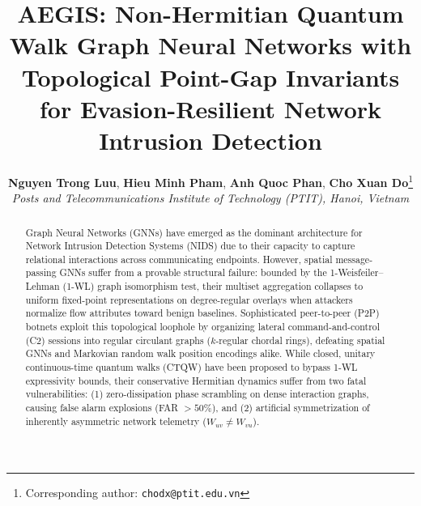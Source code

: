 \documentclass[10pt,twocolumn,letterpaper]{article}
\title{\textbf{AEGIS: Non-Hermitian Quantum Walk Graph Neural Networks with Topological Point-Gap Invariants for Evasion-Resilient Network Intrusion Detection}}
\author{
    \textbf{Nguyen Trong Luu}, \textbf{Hieu Minh Pham}, \textbf{Anh Quoc Phan}, \textbf{Cho Xuan Do}\thanks{Corresponding author: \texttt{chodx@ptit.edu.vn}} \\
    \textit{Posts and Telecommunications Institute of Technology (PTIT), Hanoi, Vietnam}
}
\date{}
\begin{document}
\maketitle

\begin{abstract}
Graph Neural Networks (GNNs) have emerged as the dominant architecture for Network Intrusion Detection Systems (NIDS) due to their capacity to capture relational interactions across communicating endpoints. However, spatial message-passing GNNs suffer from a provable structural failure: bounded by the 1-Weisfeiler--Lehman (1-WL) graph isomorphism test, their multiset aggregation collapses to uniform fixed-point representations on degree-regular overlays when attackers normalize flow attributes toward benign baselines. Sophisticated peer-to-peer (P2P) botnets exploit this topological loophole by organizing lateral command-and-control (C2) sessions into regular circulant graphs ($k$-regular chordal rings), defeating spatial GNNs and Markovian random walk position encodings alike. While closed, unitary continuous-time quantum walks (CTQW) have been proposed to bypass 1-WL expressivity bounds, their conservative Hermitian dynamics suffer from two fatal vulnerabilities: (1) zero-dissipation phase scrambling on dense interaction graphs, causing false alarm explosions (FAR $> 50\%$), and (2) artificial symmetrization of inherently asymmetric network telemetry ($W_{uv} \ne W_{vu}$).


\end{abstract}
\end{document}
